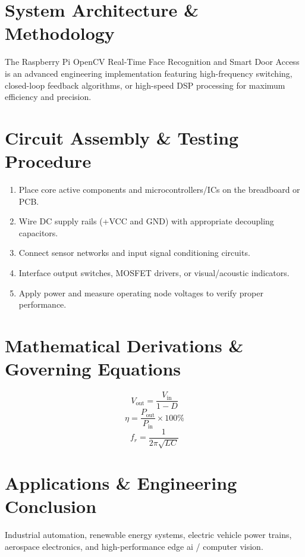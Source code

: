 \documentclass[11pt,a4paper]{article}
\begin{document}
\section{System Architecture \& Methodology}
The Raspberry Pi OpenCV Real-Time Face Recognition and Smart Door Access is an advanced engineering implementation featuring high-frequency switching, closed-loop feedback algorithms, or high-speed DSP processing for maximum efficiency and precision.

\section{Circuit Assembly \& Testing Procedure}
\begin{enumerate}
    \item Place core active components and microcontrollers/ICs on the breadboard or PCB.
    \item Wire DC supply rails (+VCC and GND) with appropriate decoupling capacitors.
    \item Connect sensor networks and input signal conditioning circuits.
    \item Interface output switches, MOSFET drivers, or visual/acoustic indicators.
    \item Apply power and measure operating node voltages to verify proper performance.
\end{enumerate}

\section{Mathematical Derivations \& Governing Equations}
\begin{equation}
V_{\text{out}} = \frac{V_{\text{in}}}{1 - D}
\end{equation}
\begin{equation}
\eta = \frac{P_{\text{out}}}{P_{\text{in}}} \times 100\%
\end{equation}
\begin{equation}
f_r = \frac{1}{2\pi \sqrt{L C}}
\end{equation}

\section{Applications \& Engineering Conclusion}
Industrial automation, renewable energy systems, electric vehicle power trains, aerospace electronics, and high-performance edge ai / computer vision.
\end{document}
